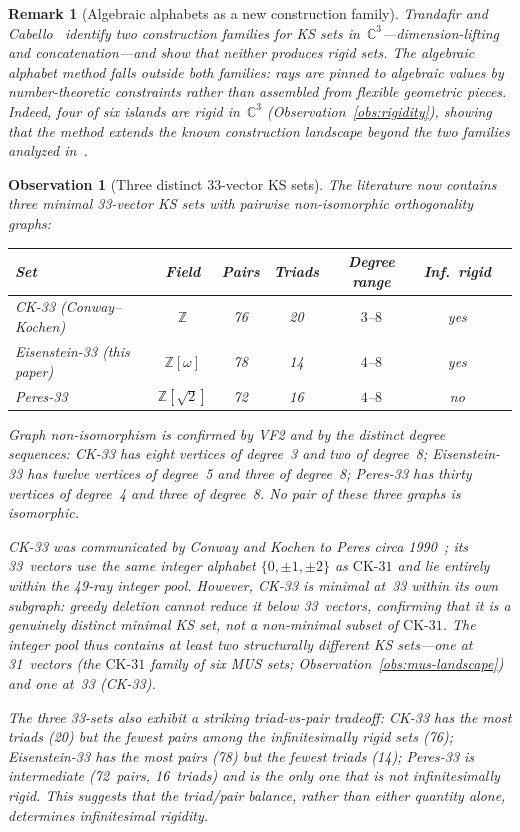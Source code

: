 \documentclass[12pt,a4paper]{article}
\newtheorem{observation}[theorem]{Observation}
\newtheorem{remark}[theorem]{Remark}
\newcommand{\C}{\mathbb{C}}
\newcommand{\Z}{\mathbb{Z}}
\newcommand{\CK}{\mathrm{CK}\text{-}31}
\begin{document}
\begin{remark}[Algebraic alphabets as a new construction family]\label{rem:new-construction}
Trandafir and Cabello~\cite{TrandafirCabello2025} identify two construction families for KS sets in~$\C^3$---dimension-lifting and concatenation---and show that neither produces rigid sets.  The algebraic alphabet method falls outside both families: rays are pinned to algebraic values by number-theoretic constraints rather than assembled from flexible geometric pieces.  Indeed, four of six islands are rigid in~$\C^3$ (Observation~\ref{obs:rigidity}), showing that the method extends the known construction landscape beyond the two families analyzed in~\cite{TrandafirCabello2025}.
\end{remark}

\begin{observation}[Three distinct 33-vector KS sets]\label{obs:three-33}
The literature now contains three minimal 33-vector KS sets with pairwise non-isomorphic orthogonality graphs:

\medskip
\begin{center}
\renewcommand{\arraystretch}{1.1}
\begin{tabular}{lcccccc}
\hline
Set & Field & Pairs & Triads & Degree range & Inf.\ rigid \\
\hline
CK-33 (Conway--Kochen) & $\Z$ & 76 & 20 & $3$--$8$ & yes \\
Eisenstein-33 (this paper) & $\Z[\omega]$ & 78 & 14 & $4$--$8$ & yes \\
Peres-33 & $\Z[\sqrt{2}]$ & 72 & 16 & $4$--$8$ & no \\
\hline
\end{tabular}
\end{center}
\medskip

Graph non-isomorphism is confirmed by VF2 and by the distinct degree sequences: CK-33 has eight vertices of degree~3 and two of degree~8; Eisenstein-33 has twelve vertices of degree~5 and three of degree~8; Peres-33 has thirty vertices of degree~4 and three of degree~8.  No pair of these three graphs is isomorphic.

CK-33 was communicated by Conway and Kochen to Peres circa 1990~\cite{Peres1991}; its 33~vectors use the same integer alphabet $\{0, \pm 1, \pm 2\}$ as $\CK$ and lie entirely within the 49-ray integer pool.  However, CK-33 is \emph{minimal at~33 within its own subgraph}: greedy deletion cannot reduce it below 33~vectors, confirming that it is a genuinely distinct minimal KS set, not a non-minimal subset of $\CK$.  The integer pool thus contains at least two structurally different KS sets---one at 31~vectors (the $\CK$ family of six MUS sets; Observation~\ref{obs:mus-landscape}) and one at~33 (CK-33).

The three 33-sets also exhibit a striking triad-vs-pair tradeoff: CK-33 has the most triads (20) but the fewest pairs among the infinitesimally rigid sets (76); Eisenstein-33 has the most pairs (78) but the fewest triads (14); Peres-33 is intermediate (72~pairs, 16~triads) and is the only one that is not infinitesimally rigid.  This suggests that the triad/pair balance, rather than either quantity alone, determines infinitesimal rigidity.
\end{observation}
\end{document}
